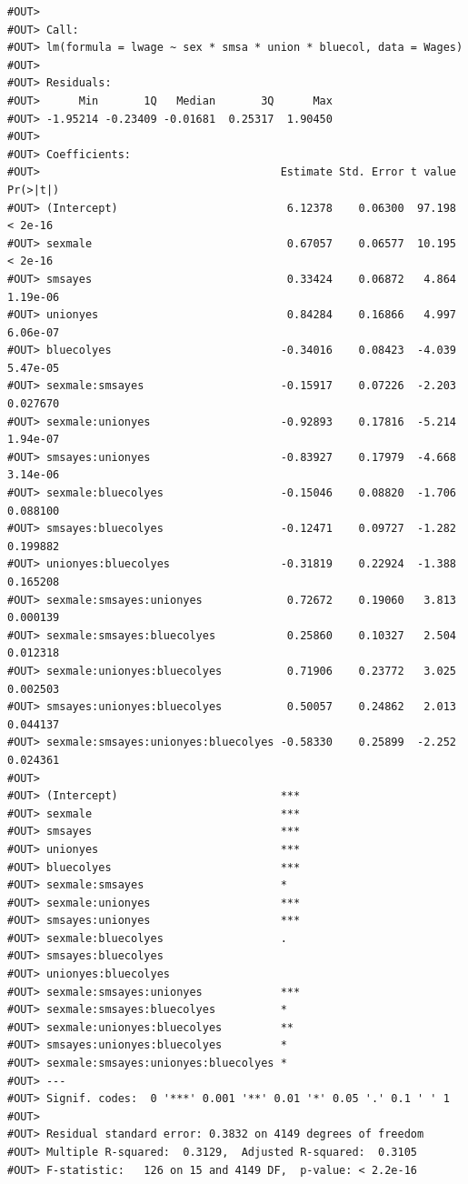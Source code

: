 \documentclass[]{book}
\theoremstyle{definition}
\theoremstyle{definition}
\theoremstyle{definition}
\theoremstyle{remark}
\begin{document}
\begin{verbatim}
#OUT> 
#OUT> Call:
#OUT> lm(formula = lwage ~ sex * smsa * union * bluecol, data = Wages)
#OUT> 
#OUT> Residuals:
#OUT>      Min       1Q   Median       3Q      Max 
#OUT> -1.95214 -0.23409 -0.01681  0.25317  1.90450 
#OUT> 
#OUT> Coefficients:
#OUT>                                     Estimate Std. Error t value Pr(>|t|)
#OUT> (Intercept)                          6.12378    0.06300  97.198  < 2e-16
#OUT> sexmale                              0.67057    0.06577  10.195  < 2e-16
#OUT> smsayes                              0.33424    0.06872   4.864 1.19e-06
#OUT> unionyes                             0.84284    0.16866   4.997 6.06e-07
#OUT> bluecolyes                          -0.34016    0.08423  -4.039 5.47e-05
#OUT> sexmale:smsayes                     -0.15917    0.07226  -2.203 0.027670
#OUT> sexmale:unionyes                    -0.92893    0.17816  -5.214 1.94e-07
#OUT> smsayes:unionyes                    -0.83927    0.17979  -4.668 3.14e-06
#OUT> sexmale:bluecolyes                  -0.15046    0.08820  -1.706 0.088100
#OUT> smsayes:bluecolyes                  -0.12471    0.09727  -1.282 0.199882
#OUT> unionyes:bluecolyes                 -0.31819    0.22924  -1.388 0.165208
#OUT> sexmale:smsayes:unionyes             0.72672    0.19060   3.813 0.000139
#OUT> sexmale:smsayes:bluecolyes           0.25860    0.10327   2.504 0.012318
#OUT> sexmale:unionyes:bluecolyes          0.71906    0.23772   3.025 0.002503
#OUT> smsayes:unionyes:bluecolyes          0.50057    0.24862   2.013 0.044137
#OUT> sexmale:smsayes:unionyes:bluecolyes -0.58330    0.25899  -2.252 0.024361
#OUT>                                        
#OUT> (Intercept)                         ***
#OUT> sexmale                             ***
#OUT> smsayes                             ***
#OUT> unionyes                            ***
#OUT> bluecolyes                          ***
#OUT> sexmale:smsayes                     *  
#OUT> sexmale:unionyes                    ***
#OUT> smsayes:unionyes                    ***
#OUT> sexmale:bluecolyes                  .  
#OUT> smsayes:bluecolyes                     
#OUT> unionyes:bluecolyes                    
#OUT> sexmale:smsayes:unionyes            ***
#OUT> sexmale:smsayes:bluecolyes          *  
#OUT> sexmale:unionyes:bluecolyes         ** 
#OUT> smsayes:unionyes:bluecolyes         *  
#OUT> sexmale:smsayes:unionyes:bluecolyes *  
#OUT> ---
#OUT> Signif. codes:  0 '***' 0.001 '**' 0.01 '*' 0.05 '.' 0.1 ' ' 1
#OUT> 
#OUT> Residual standard error: 0.3832 on 4149 degrees of freedom
#OUT> Multiple R-squared:  0.3129,  Adjusted R-squared:  0.3105 
#OUT> F-statistic:   126 on 15 and 4149 DF,  p-value: < 2.2e-16
\end{verbatim}
\end{document}
